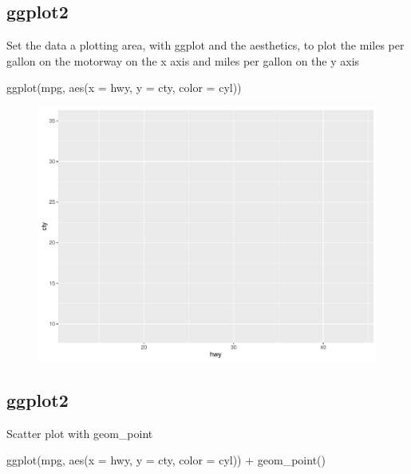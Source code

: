 \documentclass[
  letterpaper,
  DIV=11,
  numbers=noendperiod,
  landscape]{scrartcl}
\newenvironment{Shaded}{\begin{snugshade}}{\end{snugshade}}
\newcommand{\AttributeTok}[1]{\textcolor[rgb]{0.40,0.45,0.13}{#1}}
\newcommand{\FunctionTok}[1]{\textcolor[rgb]{0.28,0.35,0.67}{#1}}
\newcommand{\NormalTok}[1]{\textcolor[rgb]{0.00,0.23,0.31}{#1}}
\newcommand{\SpecialCharTok}[1]{\textcolor[rgb]{0.37,0.37,0.37}{#1}}
\begin{document}
\hypertarget{ggplot2-1}{%
\subsection{ggplot2}\label{ggplot2-1}}

Set the data a plotting area, with ggplot and the aesthetics, to plot
the miles per gallon on the motorway on the x axis and miles per gallon
on the y axis

\begin{Shaded}
\begin{Highlighting}[]
\FunctionTok{ggplot}\NormalTok{(mpg, }\FunctionTok{aes}\NormalTok{(}\AttributeTok{x =}\NormalTok{ hwy, }\AttributeTok{y =}\NormalTok{ cty, }\AttributeTok{color =}\NormalTok{ cyl))}
\end{Highlighting}
\end{Shaded}

\begin{figure}[H]

{\centering \includegraphics{RandRStudio_files/figure-pdf/unnamed-chunk-12-1.pdf}

}

\end{figure}

\hypertarget{ggplot2-2}{%
\subsection{ggplot2}\label{ggplot2-2}}

Scatter plot with geom\_point

\begin{Shaded}
\begin{Highlighting}[numbers=left,,]
\FunctionTok{ggplot}\NormalTok{(mpg, }\FunctionTok{aes}\NormalTok{(}\AttributeTok{x =}\NormalTok{ hwy, }\AttributeTok{y =}\NormalTok{ cty, }\AttributeTok{color =}\NormalTok{ cyl)) }\SpecialCharTok{+}
  \FunctionTok{geom\_point}\NormalTok{()}
\end{Highlighting}
\end{Shaded}
\end{document}
